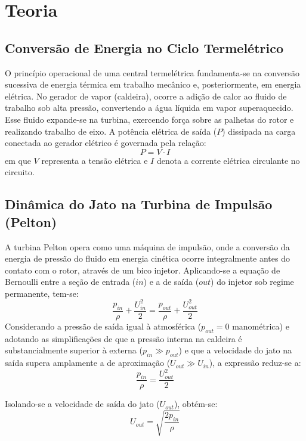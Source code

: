 \documentclass[12pt,a4paper]{article}
\begin{document}
\section{Teoria}

\subsection{Conversão de Energia no Ciclo Termelétrico}
O princípio operacional de uma central termelétrica fundamenta-se na conversão sucessiva de energia térmica em trabalho mecânico e, posteriormente, em energia elétrica. No gerador de vapor (caldeira), ocorre a adição de calor ao fluido de trabalho sob alta pressão, convertendo a água líquida em vapor superaquecido. Esse fluido expande-se na turbina, exercendo força sobre as palhetas do rotor e realizando trabalho de eixo. A potência elétrica de saída ($P$) dissipada na carga conectada ao gerador elétrico é governada pela relação:
\begin{equation}
    P = V \cdot I
\end{equation}
em que $V$ representa a tensão elétrica e $I$ denota a corrente elétrica circulante no circuito.

\subsection{Dinâmica do Jato na Turbina de Impulsão (Pelton)}
A turbina Pelton opera como uma máquina de impulsão, onde a conversão da energia de pressão do fluido em energia cinética ocorre integralmente antes do contato com o rotor, através de um bico injetor. Aplicando-se a equação de Bernoulli entre a seção de entrada ($in$) e a de saída ($out$) do injetor sob regime permanente, tem-se:
\begin{equation}
    \frac{p_{in}}{\rho} + \frac{U_{in}^{2}}{2} = \frac{p_{out}}{\rho} + \frac{U_{out}^{2}}{2}
\end{equation}
Considerando a pressão de saída igual à atmosférica ($p_{out} = 0$ manométrica) e adotando as simplificações de que a pressão interna na caldeira é substancialmente superior à externa ($p_{in} \gg p_{out}$) e que a velocidade do jato na saída supera amplamente a de aproximação ($U_{out} \gg U_{in}$), a expressão reduz-se a:
\begin{equation}
    \frac{p_{in}}{\rho} = \frac{U_{out}^{2}}{2}
\end{equation}

Isolando-se a velocidade de saída do jato ($U_{out}$), obtém-se:
\begin{equation}
    U_{out} = \sqrt{\frac{2p_{in}}{\rho}}
\end{equation}
\end{document}

